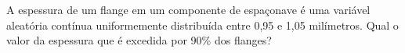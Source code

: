 %
%


\begin{exercicioBanco}[\valorquestao]
A espessura de um flange em um componente de espaçonave é uma variável aleatória contínua uniformemente distribuída entre 0,95 e 1,05 milímetros. Qual o valor da espessura que é excedida por 90\% dos flanges?
\end{exercicioBanco}

